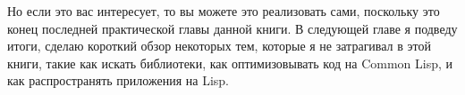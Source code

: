 Но если это вас интересует, то вы можете это реализовать сами, поскольку это конец
последней практической главы данной книги.  В следующей главе я подведу итоги, сделаю
короткий обзор некоторых тем, которые я не затрагивал в этой книги, такие как искать
библиотеки, как оптимизовывать код на Common Lisp, и как распространять приложения на
Lisp.

